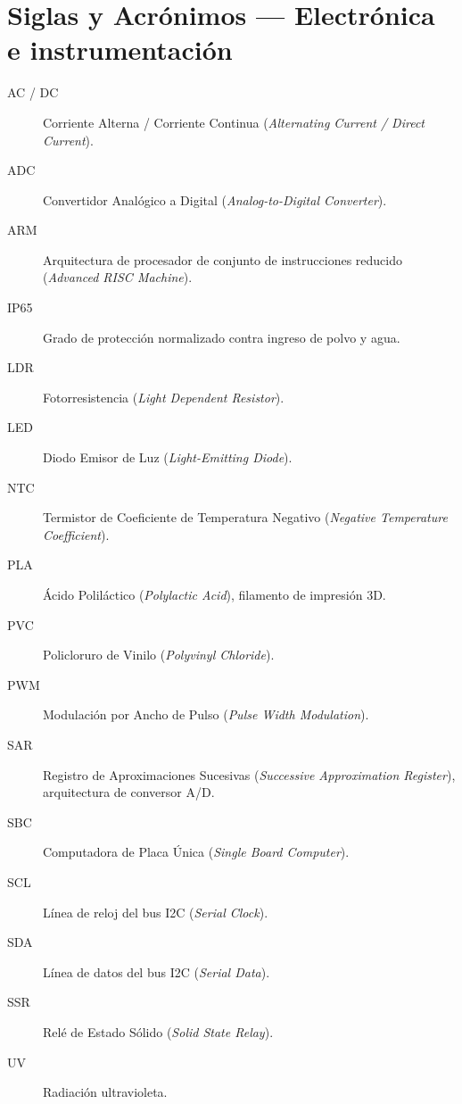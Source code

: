 \section*{Siglas y Acrónimos --- Electrónica e instrumentación}
\begin{description}
    \item[AC / DC] Corriente Alterna / Corriente Continua (\textit{Alternating Current / Direct Current}).
    \item[ADC] Convertidor Analógico a Digital (\textit{Analog-to-Digital Converter}).
    \item[ARM] Arquitectura de procesador de conjunto de instrucciones reducido (\textit{Advanced RISC Machine}).
    \item[IP65] Grado de protección normalizado contra ingreso de polvo y agua.
    \item[LDR] Fotorresistencia (\textit{Light Dependent Resistor}).
    \item[LED] Diodo Emisor de Luz (\textit{Light-Emitting Diode}).
    \item[NTC] Termistor de Coeficiente de Temperatura Negativo (\textit{Negative Temperature Coefficient}).
    \item[PLA] Ácido Poliláctico (\textit{Polylactic Acid}), filamento de impresión 3D.
    \item[PVC] Policloruro de Vinilo (\textit{Polyvinyl Chloride}).
    \item[PWM] Modulación por Ancho de Pulso (\textit{Pulse Width Modulation}).
    \item[SAR] Registro de Aproximaciones Sucesivas (\textit{Successive Approximation Register}), arquitectura de conversor A/D.
    \item[SBC] Computadora de Placa Única (\textit{Single Board Computer}).
    \item[SCL] Línea de reloj del bus I2C (\textit{Serial Clock}).
    \item[SDA] Línea de datos del bus I2C (\textit{Serial Data}).
    \item[SSR] Relé de Estado Sólido (\textit{Solid State Relay}).
    \item[UV] Radiación ultravioleta.
\end{description}

